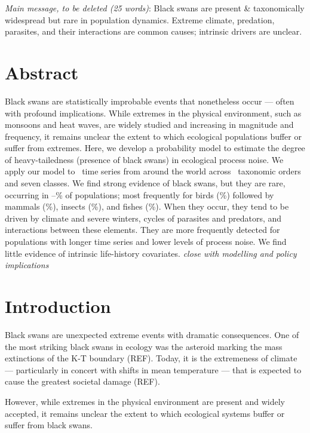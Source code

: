 
\noindent
\emph{Main message, to be deleted (25 words)}: Black swans are present \& taxonomically widespread but rare in population dynamics. Extreme climate, predation, parasites, and their interactions are common causes; intrinsic drivers are unclear.

\section{Abstract}

Black swans are statistically improbable events that nonetheless occur --- often with profound implications. While extremes in the physical environment, such as monsoons and heat waves, are widely studied and increasing in magnitude and frequency, it remains unclear the extent to which ecological populations buffer or suffer from extremes. Here, we develop a probability model to estimate the degree of heavy-tailedness (presence of black swans) in ecological process noise. We apply our model to \NPops~time series from around the world across \NOrders~taxonomic orders and seven classes. We find strong evidence of black swans, but they are rare, occurring in \overallMinPerc--\overallMaxPerc\% of populations; most frequently for birds (\AvesRangePerc\%) followed by mammals (\MammaliaRangePerc\%), insects (\InsectaRangePerc\%), and fishes (\OsteichthyesRangePerc\%). When they occur, they tend to be driven by climate and severe winters, cycles of parasites and predators, and interactions between these elements. They are more frequently detected for populations with longer time series and lower levels of process noise. We find little evidence of intrinsic life-history covariates. \emph{close with modelling and policy implications}

\section{Introduction}

Black swans are unexpected extreme events with dramatic consequences. One of the most striking black swans in ecology was the asteroid marking the mass extinctions of the K-T boundary (REF). Today, it is the extremeness of climate --- particularly in concert with shifts in mean temperature --- that is expected to cause the greatest societal damage (REF). 

However, while extremes in the physical environment are present and widely accepted, it remains unclear the extent to which ecological systems buffer or suffer from black swans.

